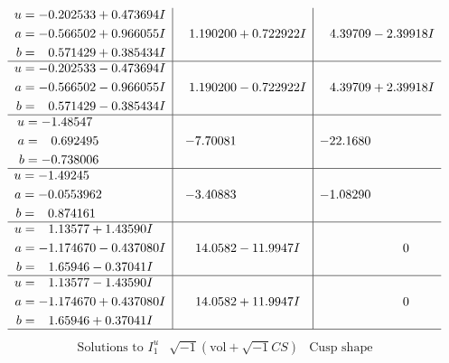 \documentclass[1p]{elsarticle_modified}
\theoremstyle{definition}
\newcommand{\I}{\sqrt{-1}}
\begin{document}
$$\begin{array}{c|c|c}
\begin{aligned}
u &= -0.202533 + 0.473694 I \\
a &= -0.566502 + 0.966055 I \\
b &= \phantom{-}0.571429 + 0.385434 I\end{aligned}
 & \phantom{-}1.190200 + 0.722922 I & \phantom{-}4.39709 - 2.39918 I \\ \hline\begin{aligned}
u &= -0.202533 - 0.473694 I \\
a &= -0.566502 - 0.966055 I \\
b &= \phantom{-}0.571429 - 0.385434 I\end{aligned}
 & \phantom{-}1.190200 - 0.722922 I & \phantom{-}4.39709 + 2.39918 I \\ \hline\begin{aligned}
u &= -1.48547\phantom{ +0.000000I} \\
a &= \phantom{-}0.692495\phantom{ +0.000000I} \\
b &= -0.738006\phantom{ +0.000000I}\end{aligned}
 & -7.70081\phantom{ +0.000000I} & -22.1680\phantom{ +0.000000I} \\ \hline\begin{aligned}
u &= -1.49245\phantom{ +0.000000I} \\
a &= -0.0553962\phantom{ +0.000000I} \\
b &= \phantom{-}0.874161\phantom{ +0.000000I}\end{aligned}
 & -3.40883\phantom{ +0.000000I} & -1.08290\phantom{ +0.000000I} \\ \hline\begin{aligned}
u &= \phantom{-}1.13577 + 1.43590 I \\
a &= -1.174670 - 0.437080 I \\
b &= \phantom{-}1.65946 - 0.37041 I\end{aligned}
 & \phantom{-}14.0582 - 11.9947 I & \phantom{-0.000000 } 0 \\ \hline\begin{aligned}
u &= \phantom{-}1.13577 - 1.43590 I \\
a &= -1.174670 + 0.437080 I \\
b &= \phantom{-}1.65946 + 0.37041 I\end{aligned}
 & \phantom{-}14.0582 + 11.9947 I & \phantom{-0.000000 } 0\\
 \hline 
 \end{array}$$\newpage$$\begin{array}{c|c|c}  
\text{Solutions to }I^u_{1}& \I (\text{vol} + \sqrt{-1}CS) & \text{Cusp shape}\\

\end{array}$$
\end{document}
